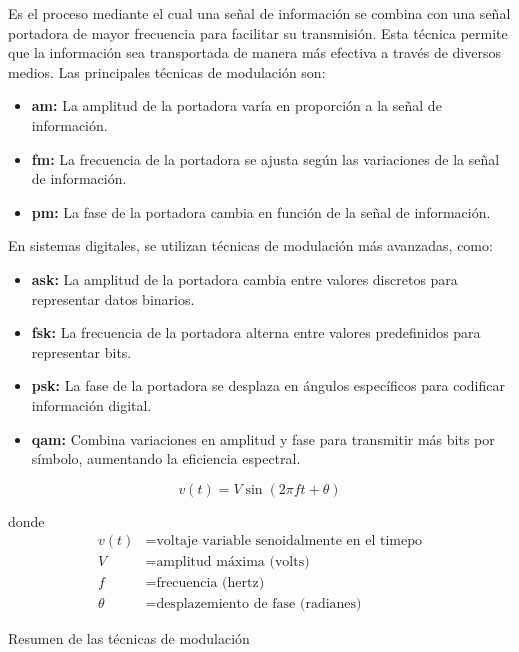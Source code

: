 \begin{justify}
    Es el proceso mediante el cual una señal de información se combina con una señal portadora de mayor frecuencia para facilitar su transmisión. Esta
    técnica permite que la información sea transportada de manera más efectiva a través de diversos medios. Las principales técnicas de modulación son:

    \begin{itemize}
        \item \textbf{\acrlong{am}:} La amplitud de la portadora varía en proporción a la señal de información.
        
        \item \textbf{\acrlong{fm}:} La frecuencia de la portadora se ajusta según las variaciones de la señal de información.
        
        \item \textbf{\acrlong{pm}:} La fase de la portadora cambia en función de la señal de información.
    \end{itemize}

    En sistemas digitales, se utilizan técnicas de modulación más avanzadas, como:

    \begin{itemize}
        \item \textbf{\acrlong{ask}:} La amplitud de la portadora cambia entre valores discretos para representar datos binarios.
        
        \item \textbf{\acrlong{fsk}:} La frecuencia de la portadora alterna entre valores predefinidos para representar bits.
        
        \item \textbf{\acrlong{psk}:} La fase de la portadora se desplaza en ángulos específicos para codificar información digital.
        
        \item \textbf{\acrlong{qam}:} Combina variaciones en amplitud y fase para transmitir más bits por símbolo, aumentando la eficiencia espectral.
    \end{itemize}

    \begin{equation}
        v(t) = V \sin(2\pi f t + \theta)
        \label{sin_mod}
    \end{equation}

    donde
    \begin{equation*}
        \begin{array}{rl}
            v(t) & = \text{voltaje variable senoidalmente en el timepo}\\
            V & = \text{amplitud máxima (volts)}\\
            f & = \text{frecuencia (hertz)}\\
            \theta & = \text{desplazemiento de fase (radianes)}
        \end{array}
    \end{equation*}

    Resumen de las técnicas de modulación
\end{justify}

